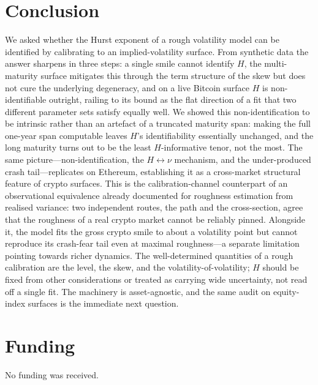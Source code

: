 \documentclass[namedate,webpdf]{ima-authoring-template}
\numberwithin{equation}{section}
\begin{document}
\section{Conclusion}\label{sec:conclusion}

We asked whether the Hurst exponent of a rough volatility model can be identified by calibrating to an
implied-volatility surface. From synthetic data the answer sharpens in three steps: a single smile
cannot identify $H$, the multi-maturity surface mitigates this through the term structure of the skew
but does not cure the underlying degeneracy, and on a live Bitcoin surface $H$ is non-identifiable
outright, railing to its bound as the flat direction of a fit that two different parameter sets satisfy
equally well. We showed this non-identification to be intrinsic rather than an artefact of a truncated
maturity span: making the full one-year span computable leaves $H$'s identifiability essentially
unchanged, and the long maturity turns out to be the least $H$-informative tenor, not the most. The
same picture---non-identification, the $H\leftrightarrow\nu$ mechanism, and the under-produced crash
tail---replicates on Ethereum, establishing it as a cross-market structural feature of crypto surfaces.
This is the calibration-channel counterpart of an observational equivalence already documented for
roughness estimation from realised variance: two independent routes, the path and the cross-section,
agree that the roughness of a real crypto market cannot be reliably pinned. Alongside it, the model
fits the gross crypto smile to about a volatility point but cannot reproduce its crash-fear tail even
at maximal roughness---a separate limitation pointing towards richer dynamics. The well-determined
quantities of a rough calibration are the level, the skew, and the volatility-of-volatility; $H$
should be fixed from other considerations or treated as carrying wide uncertainty, not read off a
single fit. The machinery is asset-agnostic, and the same audit on equity-index surfaces is the
immediate next question.

\section*{Funding}
No funding was received.
\end{document}
